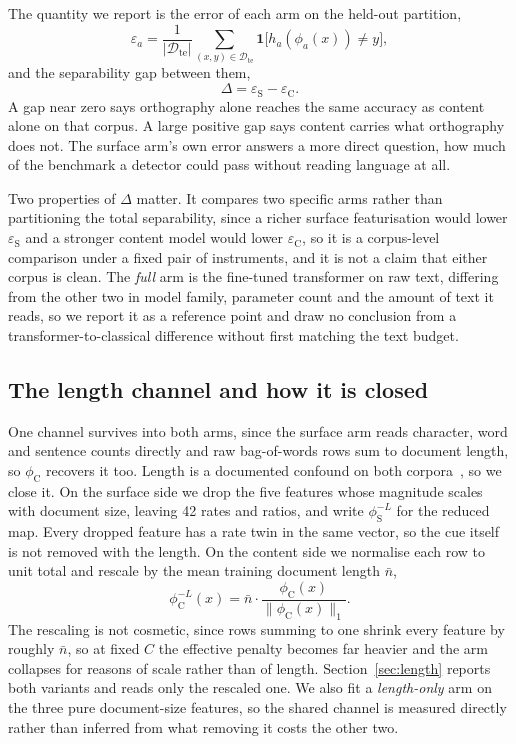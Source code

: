 The quantity we report is the error of each arm on the held-out partition,
\begin{equation}
\label{eq:err}
\varepsilon_{a}  =  \frac{1}{|\mathcal{D}_{\text{te}}|}\sum_{(x,y)\in\mathcal{D}_{\text{te}}} \mathbf{1}\big[h_{a}(\phi_{a}(x)) \neq y\big],
\end{equation}
and the separability gap between them,
\begin{equation}
\label{eq:gap}
\Delta  =  \varepsilon_{\mathrm{S}} - \varepsilon_{\mathrm{C}} .
\end{equation}
A gap near zero says orthography alone reaches the same accuracy as content alone on that corpus. A large positive gap says content carries what orthography does not. The surface arm's own error answers a more direct question, how much of the benchmark a detector could pass without reading language at all.

Two properties of $\Delta$ matter. It compares two specific arms rather than partitioning the total separability, since a richer surface featurisation would lower $\varepsilon_{\mathrm{S}}$ and a stronger content model would lower $\varepsilon_{\mathrm{C}}$, so it is a corpus-level comparison under a fixed pair of instruments, and it is not a claim that either corpus is clean. The \emph{full} arm is the fine-tuned transformer on raw text, differing from the other two in model family, parameter count and the amount of text it reads, so we report it as a reference point and draw no conclusion from a transformer-to-classical difference without first matching the text budget.

\subsection{The length channel and how it is closed}
\label{sec:lengthdef}

One channel survives into both arms, since the surface arm reads character, word and sentence counts directly and raw bag-of-words rows sum to document length, so $\phi_{\mathrm{C}}$ recovers it too. Length is a documented confound on both corpora~\cite{Baidya2026detecting}, so we close it. On the surface side we drop the five features whose magnitude scales with document size, leaving 42 rates and ratios, and write $\phi_{\mathrm{S}}^{-L}$ for the reduced map. Every dropped feature has a rate twin in the same vector, so the cue itself is not removed with the length. On the content side we normalise each row to unit total and rescale by the mean training document length $\bar{n}$,
\begin{equation}
\label{eq:l1}
\phi_{\mathrm{C}}^{-L}(x) = \bar{n} \cdot \frac{\phi_{\mathrm{C}}(x)}{\lVert \phi_{\mathrm{C}}(x) \rVert_1} .
\end{equation}
The rescaling is not cosmetic, since rows summing to one shrink every feature by roughly $\bar{n}$, so at fixed $C$ the effective penalty becomes far heavier and the arm collapses for reasons of scale rather than of length. Section~\ref{sec:length} reports both variants and reads only the rescaled one. We also fit a \emph{length-only} arm on the three pure document-size features, so the shared channel is measured directly rather than inferred from what removing it costs the other two.

